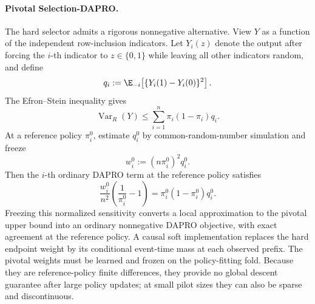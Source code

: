 \paragraph{Pivotal Selection-DAPRO.}
The hard selector admits a rigorous nonnegative alternative.  View $Y$ as a
function of the independent row-inclusion indicators.  Let $Y_i(z)$ denote
the output after forcing the $i$-th indicator to $z\in\{0,1\}$ while leaving
all other indicators random, and define
\begin{equation}
    q_i:=\E_{-i}\!\left[
      \{Y_i(1)-Y_i(0)\}^2
    \right].
\end{equation}
The Efron--Stein inequality gives
\begin{equation}
    \operatorname{Var}_R(Y)
    \leq\sum_{i=1}^n\pi_i(1-\pi_i)q_i.
    \label{eq:pivotal_selection_bound}
\end{equation}
At a reference policy $\pi_i^0$, estimate $q_i^0$ by common-random-number
simulation and freeze
\begin{equation}
    w_i^0:=(n\pi_i^0)^2q_i^0.
    \label{eq:pivotal_selection_weight}
\end{equation}
Then the $i$-th ordinary DAPRO term at the reference policy satisfies
\begin{equation}
    \frac{w_i^0}{n^2}
      \left(\frac{1}{\pi_i^0}-1\right)
    =\pi_i^0(1-\pi_i^0)q_i^0.
\end{equation}
Freezing this normalized sensitivity converts a local approximation to the
pivotal upper bound into an ordinary nonnegative DAPRO objective, with exact
agreement at the reference policy.  A causal soft implementation replaces
the hard endpoint weight by its conditional event-time mass at each observed
prefix.  The pivotal weights must be learned and frozen on the policy-fitting
fold.  Because they are reference-policy finite differences, they provide no
global descent guarantee after large policy updates; at small pilot sizes
they can also be sparse and discontinuous.

